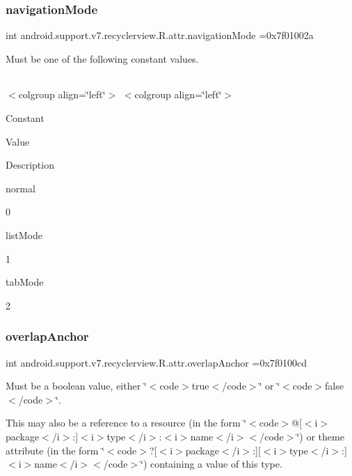 \subsubsection{\texorpdfstring{navigation\+Mode}{navigationMode}}
{\footnotesize\ttfamily int android.\+support.\+v7.\+recyclerview.\+R.\+attr.\+navigation\+Mode =0x7f01002a\hspace{0.3cm}{\ttfamily [static]}}

Must be one of the following constant values.

\tabulinesep=1mm
\begin{longtabu} spread 0pt [c]{*{0}{|X[-1]}|}
\hline
\end{longtabu}
$<$colgroup align=\char`\"{}left\char`\"{}$>$ $<$colgroup align=\char`\"{}left\char`\"{}$>$ 

Constant

Value

Description 

{\ttfamily normal}

0

{\ttfamily list\+Mode}

1

{\ttfamily tab\+Mode}

2\mbox{\label{classandroid_1_1support_1_1v7_1_1recyclerview_1_1R_1_1attr_ad6479f9b668a3b7c7ebec2a088507af4}} 
\subsubsection{\texorpdfstring{overlap\+Anchor}{overlapAnchor}}
{\footnotesize\ttfamily int android.\+support.\+v7.\+recyclerview.\+R.\+attr.\+overlap\+Anchor =0x7f0100cd\hspace{0.3cm}{\ttfamily [static]}}

Must be a boolean value, either \char`\"{}$<$code$>$true$<$/code$>$\char`\"{} or \char`\"{}$<$code$>$false$<$/code$>$\char`\"{}. 

This may also be a reference to a resource (in the form \char`\"{}$<$code$>$@\mbox{[}$<$i$>$package$<$/i$>$\+:\mbox{]}$<$i$>$type$<$/i$>$\+:$<$i$>$name$<$/i$>$$<$/code$>$\char`\"{}) or theme attribute (in the form \char`\"{}$<$code$>$?\mbox{[}$<$i$>$package$<$/i$>$\+:\mbox{]}\mbox{[}$<$i$>$type$<$/i$>$\+:\mbox{]}$<$i$>$name$<$/i$>$$<$/code$>$\char`\"{}) containing a value of this type. \mbox{\label{classandroid_1_1support_1_1v7_1_1recyclerview_1_1R_1_1attr_a76234d9d13a4b9568c499a59c276cdb0}} 
